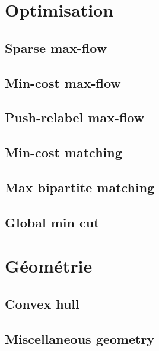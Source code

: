 \documentclass[12pt]{article}
\begin{document}
\section{Optimisation}

\subsection{Sparse max-flow}
{\scriptsize}

\subsection{Min-cost max-flow}
{\scriptsize}

\subsection{Push-relabel max-flow}
{\scriptsize}

\subsection{Min-cost matching}
{\scriptsize}

\subsection{Max bipartite matching}
{\scriptsize}

\subsection{Global min cut}
{\scriptsize}

\section{Géométrie}

\subsection{Convex hull}
{\scriptsize}

\subsection{Miscellaneous geometry}
{\scriptsize}
\end{document}
